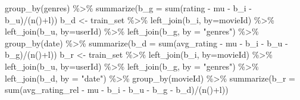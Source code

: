 \documentclass[
]{article}
\newenvironment{Shaded}{}{}
\newcommand{\AttributeTok}[1]{\textcolor[rgb]{0.49,0.56,0.16}{#1}}
\newcommand{\FunctionTok}[1]{\textcolor[rgb]{0.02,0.16,0.49}{#1}}
\newcommand{\NormalTok}[1]{#1}
\newcommand{\OtherTok}[1]{\textcolor[rgb]{0.00,0.44,0.13}{#1}}
\newcommand{\SpecialCharTok}[1]{\textcolor[rgb]{0.25,0.44,0.63}{#1}}
\newcommand{\StringTok}[1]{\textcolor[rgb]{0.25,0.44,0.63}{#1}}
\begin{document}
\begin{Shaded}
\begin{Highlighting}[]
    \FunctionTok{group\_by}\NormalTok{(genres) }\SpecialCharTok{\%\textgreater{}\%} 
    \FunctionTok{summarize}\NormalTok{(}\AttributeTok{b\_g =} \FunctionTok{sum}\NormalTok{(rating }\SpecialCharTok{{-}}\NormalTok{ mu }\SpecialCharTok{{-}}\NormalTok{ b\_i }\SpecialCharTok{{-}}\NormalTok{ b\_u)}\SpecialCharTok{/}\NormalTok{(}\FunctionTok{n}\NormalTok{()}\SpecialCharTok{+}\NormalTok{l))}
\NormalTok{  b\_d }\OtherTok{\textless{}{-}}\NormalTok{ train\_set }\SpecialCharTok{\%\textgreater{}\%}
    \FunctionTok{left\_join}\NormalTok{(b\_i, }\AttributeTok{by=}\StringTok{\textquotesingle{}movieId\textquotesingle{}}\NormalTok{) }\SpecialCharTok{\%\textgreater{}\%}
    \FunctionTok{left\_join}\NormalTok{(b\_u, }\AttributeTok{by=}\StringTok{\textquotesingle{}userId\textquotesingle{}}\NormalTok{) }\SpecialCharTok{\%\textgreater{}\%} 
    \FunctionTok{left\_join}\NormalTok{(b\_g, }\AttributeTok{by =} \StringTok{"genres"}\NormalTok{) }\SpecialCharTok{\%\textgreater{}\%} 
    \FunctionTok{group\_by}\NormalTok{(date) }\SpecialCharTok{\%\textgreater{}\%} 
    \FunctionTok{summarize}\NormalTok{(}\AttributeTok{b\_d =} \FunctionTok{sum}\NormalTok{(avg\_rating }\SpecialCharTok{{-}}\NormalTok{ mu }\SpecialCharTok{{-}}\NormalTok{ b\_i }\SpecialCharTok{{-}}\NormalTok{ b\_u }\SpecialCharTok{{-}}\NormalTok{ b\_g)}\SpecialCharTok{/}\NormalTok{(}\FunctionTok{n}\NormalTok{()}\SpecialCharTok{+}\NormalTok{l))}
\NormalTok{  b\_r }\OtherTok{\textless{}{-}}\NormalTok{ train\_set }\SpecialCharTok{\%\textgreater{}\%}
    \FunctionTok{left\_join}\NormalTok{(b\_i, }\AttributeTok{by=}\StringTok{\textquotesingle{}movieId\textquotesingle{}}\NormalTok{) }\SpecialCharTok{\%\textgreater{}\%}
    \FunctionTok{left\_join}\NormalTok{(b\_u, }\AttributeTok{by=}\StringTok{\textquotesingle{}userId\textquotesingle{}}\NormalTok{) }\SpecialCharTok{\%\textgreater{}\%} 
    \FunctionTok{left\_join}\NormalTok{(b\_g, }\AttributeTok{by =} \StringTok{"genres"}\NormalTok{) }\SpecialCharTok{\%\textgreater{}\%} 
    \FunctionTok{left\_join}\NormalTok{(b\_d, }\AttributeTok{by =} \StringTok{"date"}\NormalTok{) }\SpecialCharTok{\%\textgreater{}\%} 
    \FunctionTok{group\_by}\NormalTok{(movieId) }\SpecialCharTok{\%\textgreater{}\%} 
    \FunctionTok{summarize}\NormalTok{(}\AttributeTok{b\_r =} \FunctionTok{sum}\NormalTok{(avg\_rating\_rel }\SpecialCharTok{{-}}\NormalTok{ mu }\SpecialCharTok{{-}}\NormalTok{ b\_i }\SpecialCharTok{{-}}\NormalTok{ b\_u }\SpecialCharTok{{-}}\NormalTok{ b\_g }\SpecialCharTok{{-}}\NormalTok{ b\_d)}\SpecialCharTok{/}\NormalTok{(}\FunctionTok{n}\NormalTok{()}\SpecialCharTok{+}\NormalTok{l))}


\end{Highlighting}
\end{Shaded}
\end{document}
